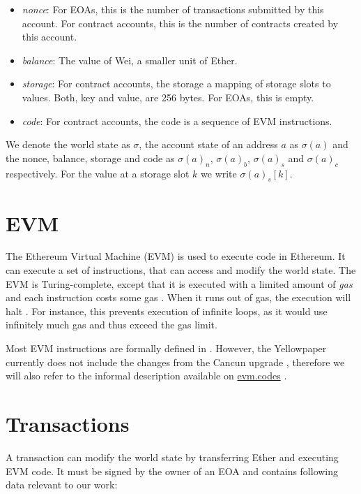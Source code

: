 \documentclass[draft,final]{vutinfth} %
\begin{document}
\begin{itemize}
    \item \emph{nonce}: For EOAs, this is the number of transactions submitted by this account. For contract accounts, this is the number of contracts created by this account.
    \item \emph{balance}: The value of Wei, a smaller unit of Ether.
    \item \emph{storage}: For contract accounts, the storage a mapping of storage slots to values. Both, key and value, are 256 bytes. For EOAs, this is empty.
    \item \emph{code}: For contract accounts, the code is a sequence of EVM instructions.
\end{itemize}

We denote the world state as $\sigma$, the account state of an address $a$ as $\sigma(a)$ and the nonce, balance, storage and code as $\sigma(a)_n$, $\sigma(a)_b$, $\sigma(a)_s$ and $\sigma(a)_c$ respectively. For the value at a storage slot $k$ we write $\sigma(a)_s[k]$.

\section{EVM}

The Ethereum Virtual Machine (EVM) is used to execute code in Ethereum. It can execute a set of instructions, that can access and modify the world state. The EVM is Turing-complete, except that it is executed with a limited amount of \emph{gas} and each instruction costs some gas \cite{wood_ethereum_2024}. When it runs out of gas, the execution will halt \cite[p.14]{wood_ethereum_2024}. For instance, this prevents execution of infinite loops, as it would use infinitely much gas and thus exceed the gas limit.

Most EVM instructions are formally defined in \cite[p.30-38]{wood_ethereum_2024}. However, the Yellowpaper currently does not include the changes from the Cancun upgrade \cite{noauthor_history_2024}, therefore we will also refer to the informal description available on \href{https://www.evm.codes/}{evm.codes} \cite{noauthor_evm_2024}.

\section{Transactions}

A transaction can modify the world state by transferring Ether and executing EVM code. It must be signed by the owner of an EOA and contains following data relevant to our work:
\end{document}
